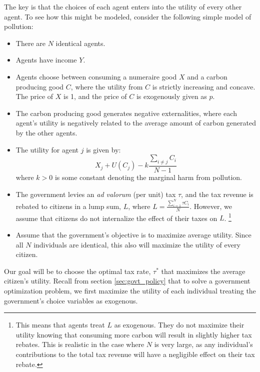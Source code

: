 The key is that the choices of each agent enters into the utility of every other agent. To see how this might be modeled, consider the following simple model of pollution:
\begin{itemize}
    \item There are $N$ identical agents.
    \item Agents have income $Y$.
    \item Agents choose between consuming a numeraire good $X$ and a carbon producing good $C$, where the utility from $C$ is strictly increasing and concave. The price of $X$ is 1, and the price of $C$ is exogenously given as $p$. 
    \item The carbon producing good generates negative externalities, where each agent's utility is negatively related to the average amount of carbon generated by the other agents. 
    \item The utility for agent $j$ is given by:
    \begin{equation*}
        X_j + U(C_j) - k \frac{\sum_{i \neq j} C_i}{N - 1}
    \end{equation*}
    where $k > 0$ is some constant denoting the marginal harm from pollution. 
    \item The government levies an \emph{ad valorum} (per unit) tax $\tau$, and the tax revenue is rebated to citizens in a lump sum, $L$, where $L = \frac{\sum_{i = 1}^N \tau C_i}{N}$. However, we assume that citizens do not internalize the effect of their taxes on $L$. \footnote{This means that agents treat $L$ as exogenous. They do not maximize their utility knowing that consuming more carbon will result in slightly higher tax rebates. This is realistic in the case where $N$ is very large, as any individual's contributions to the total tax revenue will have a negligible effect on their tax rebate.}
    \item Assume that the government's objective is to maximize average utility. Since all $N$ individuals are identical, this also will maximize the utility of every citizen. 
\end{itemize}
Our goal will be to choose the optimal tax rate, $\tau^*$ that maximizes the average citizen's utility. Recall from section \ref{sec:govt_policy} that to solve a government optimization problem, we first maximize the utility of each individual treating the government's choice variables as exogenous. 

